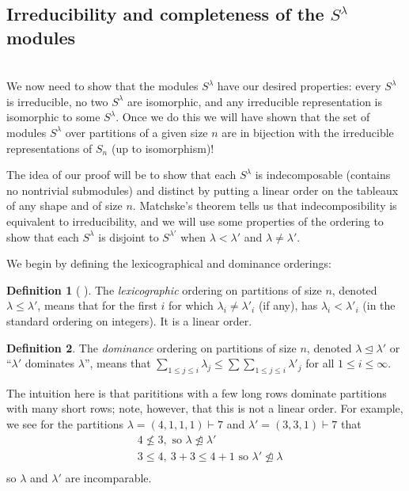 \documentclass[12pt,twoside]{reedthesis}
\theoremstyle{plain}   %
\theoremstyle{definition}
\newtheorem{defn}{Definition}[section]
\theoremstyle{remark}
\numberwithin{equation}{section}
\def\normeq{\trianglelefteq}
\begin{document}
   \subsection{Irreducibility and completeness of the $S^\lambda$ modules} \hfill\\
   We now need to show that the modules $S^\lambda$ have our desired properties: every $S^\lambda$ is irreducible, no two $S^\lambda$ are isomorphic,
   and any irreducible representation is isomorphic to some $S^\lambda$. Once we do this we will have shown that the set of modules $S^\lambda$
   over partitions of a given size $n$
   are in bijection with the irreducible representations of $S_n$ (up to isomorphism)! \par
   The idea of our proof will be to show that each $S^\lambda$ is indecomposable (contains no nontrivial submodules)
   and distinct by putting a linear order on the tableaux of any shape
   and of size $n$. Matchske's theorem tells us that indecomposibility is equivalent to irreducibility, and we will use some properties of the ordering
   to show that each $S^\lambda$ is disjoint to $S^{\lambda'}$ when $\lambda < \lambda'$ and $\lambda \neq \lambda'$.
   \par
   We begin by defining the lexicographical and dominance orderings:
   \begin{defn}[ {\cite[pg. 36]{fulton}} ]
     The \emph{lexicographic} ordering on partitions of size $n$, denoted $ \lambda \leq \lambda'$, means that
     for the first $i$ for which $\lambda_i \neq \lambda'_i$ (if any), has $\lambda_i < \lambda'_i$ (in the standard ordering on integers).
     It is a linear order.
   \end{defn}
   \begin{defn}
     The \emph{dominance} ordering on partitions of size $n$, denoted $ \lambda \normeq \lambda'$ or ``$\lambda'$ dominates $\lambda$'',
     means that $\sum_{1 \leq j \leq i} \lambda_j \leq \sum \sum_{1 \leq j \leq i} \lambda'_j$ for all $ 1 \leq i \leq \infty$. \par
     The intuition here is that parititions with a few long rows dominate partitions with many short rows; note, however, that this is
     not a linear order. For example, we see for the partitions $\lambda = (4,1,1,1) \vdash 7$ and $\lambda' = (3,3,1) \vdash 7$ that
     \begin{align*}
       &4 \not \leq 3, \text{ so $\lambda \not \normeq \lambda'$}\\
       &3 \leq  4, \ 3 + 3 \leq 4 + 1  \text{ so $\lambda' \not \normeq \lambda$}\\
     \end{align*}
     so $\lambda$ and $\lambda'$ are incomparable.
   \end{defn}
\end{document}
